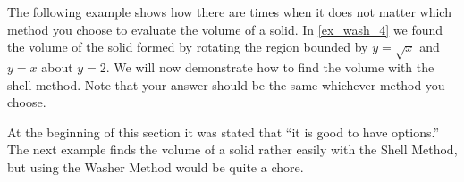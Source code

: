 The following example shows how there are times when it does not matter which method you choose to evaluate the volume of a solid. In \autoref{ex_wash_4} we found the volume of the solid formed by rotating the region bounded by $y=\sqrt x$ and $y=x$ about $y=2$. We will now demonstrate how to find the volume with the shell method. Note that your answer should be the same whichever method you choose.


At the beginning of this section it was stated that ``it is good to have options.'' The next example finds the volume of a solid rather easily with the Shell Method, but using the Washer Method would be quite a chore.

